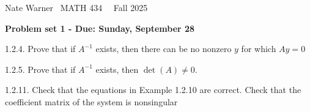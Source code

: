 \documentclass{report}
\title{\Huge{}}
\author{\huge{Nathan Warner}}
\date{\huge{}}
\begin{document}
    \pagebreak \bigbreak \noindent
    Nate Warner \ \quad \quad \quad \quad \quad \quad \quad \quad \quad \quad \quad \quad  MATH 434 \quad  \quad \quad \quad \quad \quad \quad \quad \quad \ \ \quad \quad Fall 2025
    \begin{center}
        \textbf{Problem set 1 - Due: Sunday, September 28}
    \end{center}
    \bigbreak \noindent 
    \begin{mdframed}
        1.2.4. Prove that if $A^{-1}$ exists, then there can be no nonzero $y$ for which $Ay = 0$
    \end{mdframed}

    \bigbreak \noindent 
    \begin{mdframed}
        1.2.5. Prove that if $A^{-1}$ exists, then $\det(A) \ne 0$.
    \end{mdframed}

    \bigbreak \noindent 
    \begin{mdframed}
        1.2.11. Check that the equations in Example 1.2.10 are correct. Check that the coefficient matrix of the system is nonsingular
    \end{mdframed}
\end{document}
